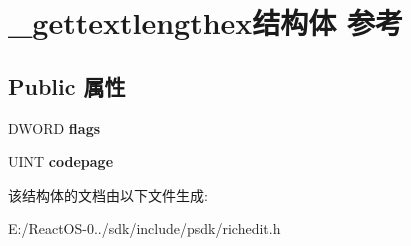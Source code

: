 \hypertarget{struct__gettextlengthex}{}\section{\+\_\+gettextlengthex结构体 参考}
\label{struct__gettextlengthex}
\subsection*{Public 属性}
\begin{DoxyCompactItemize}
\item 
\mbox{\label{struct__gettextlengthex_a2f192b310d52dcef4b54bcb648e51b97}} 
D\+W\+O\+RD {\bfseries flags}
\item 
\mbox{\label{struct__gettextlengthex_a5dac9dbd46ffd994b0678e7b1aa27a1a}} 
U\+I\+NT {\bfseries codepage}
\end{DoxyCompactItemize}


该结构体的文档由以下文件生成\+:\begin{DoxyCompactItemize}
\item 
E\+:/\+React\+O\+S-\/0../sdk/include/psdk/richedit.\+h\end{DoxyCompactItemize}
